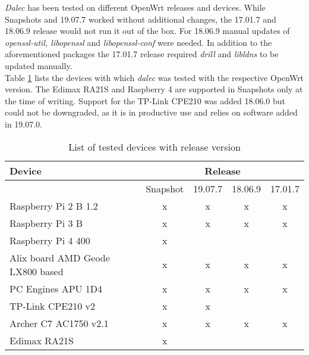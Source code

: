     \textit{Dalec} has been tested on different OpenWrt releases and devices. While Snapshots and 19.07.7 worked without additional changes, the 17.01.7 and 18.06.9 release would not run it out of the box. For 18.06.9 manual updates of \textit{openssl-util, libopenssl} and \textit{libopenssl-conf} were needed. 
    In addition to the aforementioned packages the 17.01.7 release required \textit{drill} and \textit{libldns} to be updated manually.\\
    Table \ref{tbl:dev_test} lists the devices with which \textit{dalec} was tested with the respective OpenWrt version. The Edimax RA21S and Raspberry 4 are supported in Snapshots only at the time of writing. Support for the TP-Link CPE210 was added 18.06.0 but could not be downgraded, as it is in productive use and relies on software added in 19.07.0.
    
   \begin{table}
    \centering
    \caption{List of tested devices with release version}
    \label{tbl:dev_test}
    \begin{tabular}{|l|c|c|c|c|} 
        \hline
        Device & \multicolumn{4}{c|}{Release} \\ 
        \hline
               & \multicolumn{1}{l|}{Snapshot} & \multicolumn{1}{l|}{19.07.7} & \multicolumn{1}{l|}{18.06.9} & \multicolumn{1}{l|}{17.01.7}  \\ 
        \hline
        Raspberry Pi 2 B 1.2 & x & x & x & x \\ 
        \hline
        Raspberry Pi 3 B & x & x & x & x \\ 
        \hline
        Raspberry Pi 4 400 & x & & & \\ 
        \hline
        Alix board AMD Geode LX800 based & x & x & x & x \\ 
        \hline
        PC Engines APU 1D4 & x & x & x & x \\ 
        \hline
        TP-Link CPE210 v2 & x & x & \multicolumn{1}{l|}{} & \multicolumn{1}{l|}{} \\ 
        \hline
        Archer C7 AC1750 v2.1 & x & x & x & x \\ 
        \hline
        Edimax RA21S & x & \multicolumn{1}{l|}{} & \multicolumn{1}{l|}{} & \multicolumn{1}{l|}{} \\
        \hline
    \end{tabular}
\end{table}
